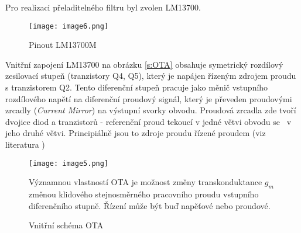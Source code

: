 \begin{center}
\begin{table}[h]
  \caption[Porovnání integrovaných obvodů se dvěma OTA]{\label{tab:Porovnání IC se dvěma OTA}Porovnání IC se dvěma OTA \cite{16}}
  \end{table}
\end{center}
\noindent Pro realizaci přeladitelného filtru byl zvolen LM13700.
\begin{figure}[h]
\centering
\texttt{[image: image6.png]}
\caption[Pinout LM13700M]{Pinout LM13700M \cite{17} \label{s:PIN}}
\end{figure}
\noindent Vnitřní zapojení LM13700 na obrázku \ref{s:OTA} obsahuje symetrický rozdílový zesilovací stupeň (tranzistory Q4, Q5), který je napájen řízeným zdrojem proudu s tranzistorem Q2. Tento diferenční stupeň pracuje jako měnič vstupního rozdílového napětí na diferenční proudový signál, který je převeden proudovými zrcadly (\textit{Current Mirror}) na výstupní svorky obvodu. Proudová zrcadla zde tvoří dvojice diod a tranzistorů - referenční proud tekoucí v jedné větvi obvodu se  ~v jeho druhé větvi. Principiálně jsou to zdroje proudu řízené proudem (viz literatura \cite{20})
\begin{figure}[h]
\centering
\texttt{[image: image5.png]}
\caption[Vnitřní schéma OTA]{Vnitřní schéma OTA \cite{17}\label{sec:OTA}}
\noindent Významnou vlastností OTA je možnost změny transkonduktance $g_m$ změnou klidového stejnosměrného pracovního proudu vstupního diferenčního stupně. Řízení může být buď napěťové nebo proudové.
\end{figure}